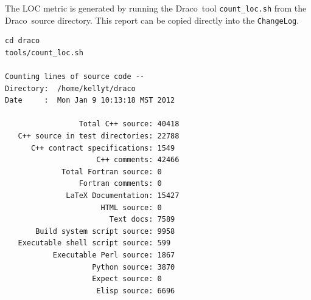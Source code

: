 \documentclass[note]{newmemo}
\newcommand{\draco}{{\normalfont\small\sffamily Draco}}
\begin{document}
The LOC metric is generated by running the \draco\ tool
\texttt{count\_loc.sh} from the \draco\ source directory.  This report
can be copied directly into the \texttt{ChangeLog}.
%
\begin{lstlisting}[basicstyle=\footnotesize, xleftmargin=1.0in, 
  xrightmargin=1.0in]
cd draco
tools/count_loc.sh

Counting lines of source code --
Directory:  /home/kellyt/draco
Date     :  Mon Jan 9 10:13:18 MST 2012

                 Total C++ source: 40418
   C++ source in test directories: 22788
      C++ contract specifications: 1549
                     C++ comments: 42466
             Total Fortran source: 0
                 Fortran comments: 0
              LaTeX Documentation: 15427
                      HTML source: 0
                        Text docs: 7589
       Build system script source: 9958
   Executable shell script source: 599
           Executable Perl source: 1867
                    Python source: 3870
                    Expect source: 0
                     Elisp source: 6696
\end{lstlisting}
\end{document}

